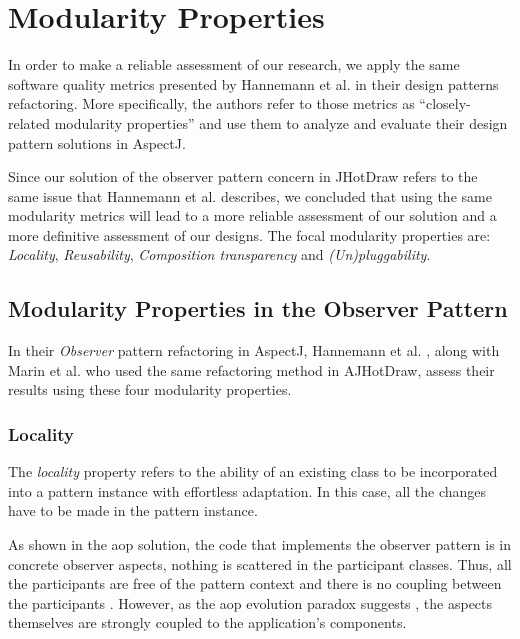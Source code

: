 \section{Modularity Properties}\label{Eval Modularity Properties}

In order to make a reliable assessment of our research, we apply the same software quality metrics presented by Hannemann et al. \cite{hannemann2002design} in their design patterns refactoring.
More specifically, the authors refer to those metrics as ``closely-related modularity properties'' and use them to analyze and evaluate their design pattern solutions in AspectJ.

Since our solution of the observer pattern concern in JHotDraw refers to the same issue that Hannemann et al. \cite{hannemann2005role} describes, we concluded that using the same modularity metrics will lead to a more reliable assessment of our solution and a more definitive assessment of our designs.
The focal modularity properties are: \textit{Locality}, \textit{Reusability}, \textit{Composition transparency} and \textit{(Un)pluggability}. 

\subsection{Modularity Properties in the Observer Pattern}

In their \textit{Observer} pattern refactoring in AspectJ, Hannemann et al. \cite{hannemann2005role}, along with Marin et al. \cite{marin2005approach} who used the same refactoring method in AJHotDraw, assess their results using these four modularity properties.

\subsubsection{Locality}
The \textit{locality} property refers to the ability of an existing class to be incorporated into a pattern instance with effortless adaptation. 
In this case, all the changes have to be made in the pattern instance.

As shown in the \ac{aop} solution, the code that implements the observer pattern is in concrete observer aspects, nothing is scattered in the participant classes. 
Thus, all the participants are free of the pattern context and there is no coupling between the participants \cite{hannemann2005role}.
However, as the \ac{aop} evolution paradox suggests \cite{tourwe2003existence}, the aspects themselves are strongly coupled to the application's components.

